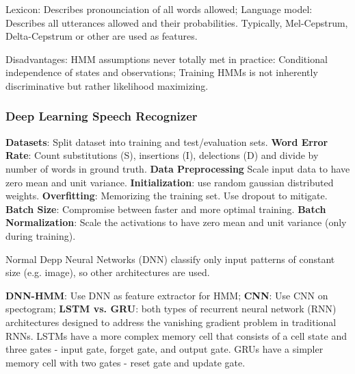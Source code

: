 \documentclass[10pt, a4paper]{article}
\begin{document}
Lexicon: Describes pronounciation of all words allowed; Language model: Describes all utterances allowed and their probabilities.
Typically, Mel-Cepstrum, Delta-Cepstrum or other are used as features.

Disadvantages: HMM assumptions never totally met in practice: Conditional independence of states and observations;
Training HMMs is not inherently discriminative but rather likelihood maximizing.

\subsubsection{Deep Learning Speech Recognizer}
\textbf{Datasets}: Split dataset into training and test/evaluation sets.
\textbf{Word Error Rate}: Count substitutions (S), insertions (I), delections (D) and divide by number of words in ground truth.
\textbf{Data Preprocessing} Scale input data to have zero mean and unit variance.
\textbf{Initialization}: use random gaussian distributed weights.
\textbf{Overfitting}: Memorizing the training set. Use dropout to mitigate.
\textbf{Batch Size}: Compromise between faster and more optimal training.
\textbf{Batch Normalization}: Scale the activations to have zero mean and unit variance (only during training).

Normal Depp Neural Networks (DNN) classify only input patterns of constant size (e.g. image), so other architectures are used.

\textbf{DNN-HMM}: Use DNN as feature extractor for HMM; \textbf{CNN}: Use CNN on spectogram;
\textbf{LSTM vs. GRU}: both types of recurrent neural network (RNN) architectures designed to address the vanishing gradient problem in traditional RNNs.
LSTMs have a more complex memory cell that consists of a cell state and three gates - input gate, forget gate, and output gate.
GRUs have a simpler memory cell with two gates - reset gate and update gate.
\end{document}
